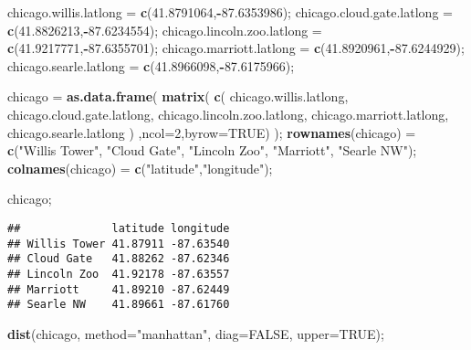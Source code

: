 \documentclass[
]{article}
\newenvironment{Shaded}{\begin{snugshade}}{\end{snugshade}}
\newcommand{\DataTypeTok}[1]{\textcolor[rgb]{0.13,0.29,0.53}{#1}}
\newcommand{\DecValTok}[1]{\textcolor[rgb]{0.00,0.00,0.81}{#1}}
\newcommand{\FloatTok}[1]{\textcolor[rgb]{0.00,0.00,0.81}{#1}}
\newcommand{\KeywordTok}[1]{\textcolor[rgb]{0.13,0.29,0.53}{\textbf{#1}}}
\newcommand{\NormalTok}[1]{#1}
\newcommand{\OperatorTok}[1]{\textcolor[rgb]{0.81,0.36,0.00}{\textbf{#1}}}
\newcommand{\OtherTok}[1]{\textcolor[rgb]{0.56,0.35,0.01}{#1}}
\newcommand{\StringTok}[1]{\textcolor[rgb]{0.31,0.60,0.02}{#1}}
\begin{document}
\begin{Shaded}
\begin{Highlighting}[]
\NormalTok{chicago.willis.latlong =}\StringTok{ }\KeywordTok{c}\NormalTok{(}\FloatTok{41.8791064}\NormalTok{,}\OperatorTok{{-}}\FloatTok{87.6353986}\NormalTok{);}
\NormalTok{chicago.cloud.gate.latlong =}\StringTok{ }\KeywordTok{c}\NormalTok{(}\FloatTok{41.8826213}\NormalTok{,}\OperatorTok{{-}}\FloatTok{87.6234554}\NormalTok{);}
\NormalTok{chicago.lincoln.zoo.latlong =}\StringTok{ }\KeywordTok{c}\NormalTok{(}\FloatTok{41.9217771}\NormalTok{,}\OperatorTok{{-}}\FloatTok{87.6355701}\NormalTok{);}
\NormalTok{chicago.marriott.latlong =}\StringTok{ }\KeywordTok{c}\NormalTok{(}\FloatTok{41.8920961}\NormalTok{,}\OperatorTok{{-}}\FloatTok{87.6244929}\NormalTok{);}
\NormalTok{chicago.searle.latlong =}\StringTok{ }\KeywordTok{c}\NormalTok{(}\FloatTok{41.8966098}\NormalTok{,}\OperatorTok{{-}}\FloatTok{87.6175966}\NormalTok{);}

\NormalTok{chicago =}\StringTok{ }\KeywordTok{as.data.frame}\NormalTok{( }\KeywordTok{matrix}\NormalTok{( }\KeywordTok{c}\NormalTok{(  chicago.willis.latlong,}
\NormalTok{                        chicago.cloud.gate.latlong,}
\NormalTok{                        chicago.lincoln.zoo.latlong,}
\NormalTok{                        chicago.marriott.latlong,}
\NormalTok{                        chicago.searle.latlong}
\NormalTok{                      )}
\NormalTok{                    ,}\DataTypeTok{ncol=}\DecValTok{2}\NormalTok{,}\DataTypeTok{byrow=}\OtherTok{TRUE}\NormalTok{) );}
  \KeywordTok{rownames}\NormalTok{(chicago) =}\StringTok{ }\KeywordTok{c}\NormalTok{(}\StringTok{"Willis Tower"}\NormalTok{, }\StringTok{"Cloud Gate"}\NormalTok{, }\StringTok{"Lincoln Zoo"}\NormalTok{, }\StringTok{"Marriott"}\NormalTok{, }\StringTok{"Searle NW"}\NormalTok{);}
  \KeywordTok{colnames}\NormalTok{(chicago) =}\StringTok{ }\KeywordTok{c}\NormalTok{(}\StringTok{"latitude"}\NormalTok{,}\StringTok{"longitude"}\NormalTok{);}

\NormalTok{chicago;}
\end{Highlighting}
\end{Shaded}

\begin{verbatim}
##              latitude longitude
## Willis Tower 41.87911 -87.63540
## Cloud Gate   41.88262 -87.62346
## Lincoln Zoo  41.92178 -87.63557
## Marriott     41.89210 -87.62449
## Searle NW    41.89661 -87.61760
\end{verbatim}

\begin{Shaded}
\begin{Highlighting}[]
\KeywordTok{dist}\NormalTok{(chicago, }\DataTypeTok{method=}\StringTok{"manhattan"}\NormalTok{, }\DataTypeTok{diag=}\OtherTok{FALSE}\NormalTok{, }\DataTypeTok{upper=}\OtherTok{TRUE}\NormalTok{);}
\end{Highlighting}
\end{Shaded}
\end{document}
